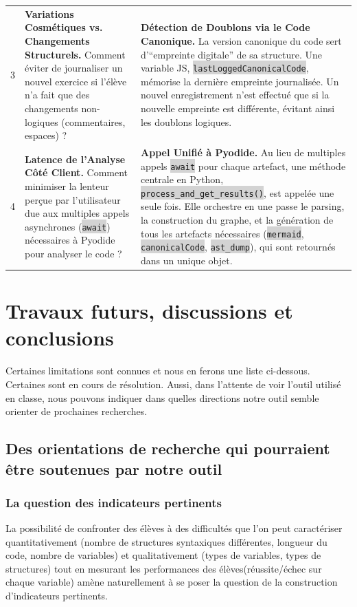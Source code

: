 \documentclass[11pt,a4paper]{article}
\newcommand{\code}[1]{\colorbox{lightgray}{\texttt{\small #1}}}
\begin{document}
\begin{table}[htbp]
\begin{tabularx}{\textwidth}{@{} l X X @{}}
        3 & \textbf{Variations Cosmétiques vs. Changements Structurels.}
            Comment éviter de journaliser un nouvel exercice si l'élève n'a fait que des changements non-logiques (commentaires, espaces) ?
            & \textbf{Détection de Doublons via le Code Canonique.}
            La version canonique du code sert d'``empreinte digitale'' de sa structure. Une variable JS, \code{lastLoggedCanonicalCode}, mémorise la dernière empreinte journalisée. Un nouvel enregistrement n'est effectué que si la nouvelle empreinte est différente, évitant ainsi les doublons logiques. \\
        \addlinespace

        4 & \textbf{Latence de l'Analyse Côté Client.}
            Comment minimiser la lenteur perçue par l'utilisateur due aux multiples appels asynchrones (\code{await}) nécessaires à Pyodide pour analyser le code ?
            & \textbf{Appel Unifié à Pyodide.}
            Au lieu de multiples appels \code{await} pour chaque artefact, une méthode centrale en Python, \code{process\_and\_get\_results()}, est appelée une seule fois. Elle orchestre en une passe le parsing, la construction du graphe, et la génération de tous les artefacts nécessaires (\code{mermaid}, \code{canonicalCode}, \code{ast\_dump}), qui sont retournés dans un unique objet. \\
        
        \bottomrule
    \end{tabularx}
\end{table}


\clearpage
\section{Travaux futurs, discussions et conclusions}
 Certaines limitations sont connues et nous en ferons une liste ci-dessous. Certaines sont en cours de résolution. Aussi, dans l'attente de voir l'outil utilisé en classe, nous pouvons indiquer dans quelles directions notre outil semble orienter de prochaines recherches.

\subsection{Des orientations de recherche qui pourraient être soutenues par notre outil}
\subsubsection{La question des indicateurs pertinents}
La possibilité de confronter des élèves à des difficultés que l'on peut caractériser quantitativement (nombre de structures syntaxiques différentes, longueur du code, nombre de variables) et qualitativement (types de variables, types de structures) tout en mesurant les performances des élèves(réussite/échec sur chaque variable) amène naturellement à se poser la question de la construction d'indicateurs pertinents.
\end{document}
